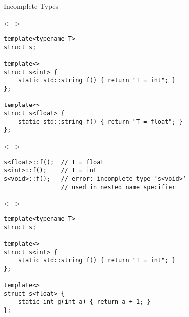 \documentclass[table]{beamer}
\begin{document}
\begin{frame}[fragile]{Incomplete Types}
  \begin{onlyenv}<+>
    \begin{verbatim}
template<typename T>
struct s;

template<>
struct s<int> {
    static std::string f() { return "T = int"; }
};

template<>
struct s<float> {
    static std::string f() { return "T = float"; }
};
    \end{verbatim}
  \end{onlyenv}

  \begin{onlyenv}<+>
    \begin{verbatim}
s<float>::f();  // T = float
s<int>::f();    // T = int
s<void>::f();   // error: incomplete type ‘s<void>’
                // used in nested name specifier
    \end{verbatim}
  \end{onlyenv}

  \begin{onlyenv}<+>
    \begin{verbatim}
template<typename T>
struct s;

template<>
struct s<int> {
    static std::string f() { return "T = int"; }
};

template<>
struct s<float> {
    static int g(int a) { return a + 1; }
};
    \end{verbatim}
  \end{onlyenv}
\end{frame}
\end{document}
